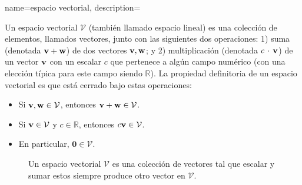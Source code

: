 {
  name={espacio vectorial},
  description={Un  espacio vectorial $\mathcal{V}$ (también llamado espacio lineal) 
  es una colección de elementos, llamados vectores, junto con las siguientes dos operaciones: 
    1) suma (denotada ${\bf v}+{\bf w}$) de dos vectores ${\bf v},{\bf w}$; y 2) multiplicación 
    (denotada $c \,\cdot \,{\bf v}$) de un vector ${\bf v}$ con un escalar $c$ que pertenece a algún 
    campo numérico (con una elección típica para este campo siendo $\mathbb{R}$). La propiedad 
    definitoria de un espacio vectorial es que está cerrado bajo estas operaciones:
    \begin{itemize}
      \item Si ${\bf v}, {\bf w} \in \mathcal{V}$, entonces ${\bf v} + {\bf w} \in \mathcal{V}$.
      \item Si ${\bf v} \in \mathcal{V}$ y $c \in \mathbb{R}$, entonces $c {\bf v} \in \mathcal{V}$.
      \item En particular, $\mathbf{0} \in \mathcal{V}$.
    \end{itemize}
    \begin{figure}[H]
    \centering
      \caption{Un espacio vectorial $\mathcal{V}$ es una colección de vectores tal que 
      escalar y sumar estos siempre produce otro vector en $\mathcal{V}$.}
      \label{fig:vector-ops_dict}
    \end{figure}
}}
